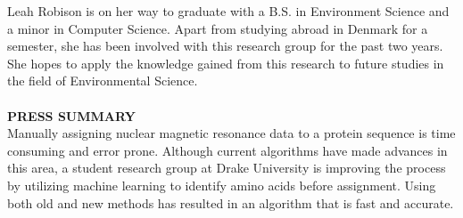 \documentclass{article}
\begin{document}
Leah Robison is on her way to graduate with a B.S. in Environment Science and a minor in Computer Science. Apart from studying abroad in Denmark for a semester, she has been involved with this research group for the past two years. She hopes to apply the knowledge gained from this research to future studies in the field of Environmental Science.
\\\\
\noindent\textbf{PRESS SUMMARY}\\
Manually assigning nuclear magnetic resonance data to a protein sequence is time consuming and error prone. Although current algorithms have made advances in this area, a student research group at Drake University is improving the process by utilizing machine learning to identify amino acids before assignment. Using both old and new methods has resulted in an algorithm that is fast and accurate. 
\end{document}
